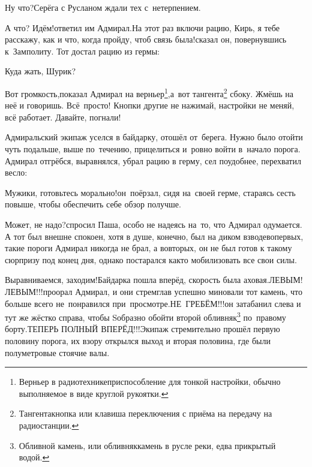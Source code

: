 \diagdash Ну что?\mdash Серёга с Русланом ждали тех с~нетерпением.

\diagdash А что? Идём!\mdash ответил им Адмирал.\mdash На этот раз включи рацию, Кирь, я тебе расскажу, как и что, когда пройду, чтоб связь была!\mdash сказал он, повернувшись к~Замполиту. Тот достал рацию из гермы:

\diagdash Куда жать, Шурик?

\renewcommand*{\thefootnote}{\arabic{footnote}}
\setcounter{footnote}{0}
\diagdash Вот громкость,\mdash показал Адмирал на верньер\footnote{Верньер в радиотехнике\mdash приспособление для тонкой настройки, обычно выполняемое в виде круглой рукоятки.},\mdash а~вот тангента\footnote{Тангента\mdash кнопка или клавиша переключения с приёма на передачу на радиостанции.} сбоку. Жмёшь на неё и говоришь. Всё~просто! Кнопки другие не нажимай, настройки не меняй, всё работает. Давайте, погнали!

Адмиральский экипаж уселся в байдарку, отошёл от~берега. Нужно было отойти чуть подальше, выше по~течению, прицелиться и~ровно войти в~начало порога. Адмирал отгрёбся, выравнялся, убрал рацию в герму, сел поудобнее, перехватил весло: 

\diagdash Мужики, готовьтесь морально!\mdash он~поёрзал, сидя на~своей герме, стараясь сесть повыше, чтобы обеспечить себе обзор получше.

\diagdash Может, не надо?\mdash спросил Паша, особо не надеясь на~то, что Адмирал одумается. А тот был внешне спокоен, хотя в душе, конечно, был на диком взводе\mdash во\sdash первых, такие пороги Адмирал никогда не брал, а во\sdash вторых, он не был готов к такому сюрпризу под конец дня, однако постарался как\sdash то мобилизовать все свои силы.

\renewcommand*{\thefootnote}{\fnsymbol{footnote}}
\setcounter{footnote}{0}
\diagdash Выравниваемся, заходим!\mdash Байдарка пошла вперёд, скорость была аховая.\mdash ЛЕВЫМ! ЛЕВЫМ!!!\mdash проорал Адмирал, и они стремглав успешно миновали тот камень, что больше всего не~понравился при~просмотре.\mdash НЕ~ГРЕБЁМ!!!\mdash он затабанил слева и тут же жёстко справа, чтобы S\sdash образно обойти второй обливняк\footnote{Обливной камень, или обливняк\mdash камень в русле реки, едва прикрытый водой.} по~правому борту.\mdash ТЕПЕРЬ ПОЛНЫЙ ВПЕРЁД!!!\mdash Экипаж стремительно прошёл первую половину порога, их взору открылся выход и вторая половина, где были полуметровые стоячие валы. 

